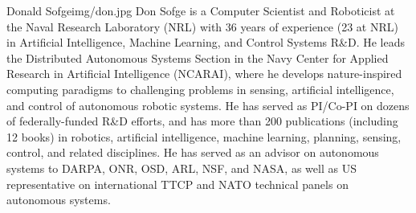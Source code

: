 \begin{biographywithpic}
{Donald Sofge}{img/don.jpg}
Don Sofge is a Computer Scientist and Roboticist at the Naval Research Laboratory (NRL) with 36 years of experience (23 at NRL) in Artificial Intelligence, Machine Learning, and Control Systems R\&D. He leads the Distributed Autonomous Systems Section in the Navy Center for Applied Research in Artificial Intelligence (NCARAI), where he develops nature-inspired computing paradigms to challenging problems in sensing, artificial intelligence, and control of autonomous robotic systems. He has served as PI/Co-PI on dozens of federally-funded R\&D efforts, and has more than 200 publications (including 12 books) in robotics, artificial intelligence, machine learning, planning, sensing, control, and related disciplines. He has served as an advisor on autonomous systems to DARPA, ONR, OSD, ARL, NSF, and NASA, as well as US representative on international TTCP and NATO technical panels on autonomous systems.
\end{biographywithpic} 